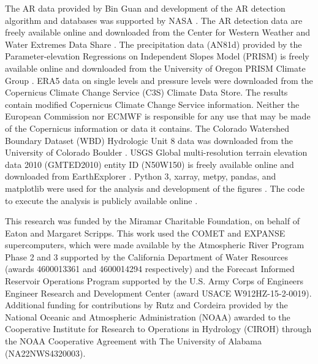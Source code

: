 \documentclass[draft]{agujournal2019}
\begin{document}
The AR data provided by Bin Guan and development of the AR detection algorithm and databases was supported by NASA \cite{Guan2022GlobalDataset}. The  AR detection data are freely available online and downloaded from the Center for Western Weather and Water Extremes Data Share \cite{Rutz2014RutzDataset}. The precipitation data (AN81d) provided by the Parameter-elevation Regressions on Independent Slopes Model (PRISM) is freely available online and downloaded from the University of Oregon PRISM Climate Group \cite{PRISMClimateGroup2004PRISMData}. ERA5 data on single levels \cite{Hersbach2018a} and pressure levels \cite{Hersbach2018} were downloaded from the Copernicus Climate Change Service (C3S) Climate Data Store. The results contain modified Copernicus Climate Change Service information. Neither the European Commission nor ECMWF is responsible for any use that may be made of the Copernicus information or data it contains. The Colorado Watershed Boundary Dataset (WBD) Hydrologic Unit 8 data was downloaded from the University of Colorado Boulder \cite{U.S.GeologicalSurvey2015ColoradoDataset}. USGS Global multi-resolution terrain elevation data 2010 (GMTED2010) entity ID (N50W150) is freely available online and downloaded from EarthExplorer \cite{Danielson2011GlobalDataset}. Python 3, xarray, metpy, pandas, and matplotlib were used for the analysis and development of the figures \cite{thomas_a_caswell_2022_6982547, 
 May2017, metpy, hoyer2017xarray, xarray_v2022.12.0, Hunter:2007, the_pandas_development_team_2022_7344967, VanRossum2009}. The code to execute the analysis is publicly available online \cite{Nash2025CO_top-decile_precipitation_ARs:Software}. 





\acknowledgments
This research was funded by the Miramar Charitable Foundation, on behalf of Eaton and Margaret Scripps. This work used the COMET and EXPANSE supercomputers, which were made available by the Atmospheric River Program Phase 2 and 3 supported by the California Department of Water Resources (awards 4600013361 and 4600014294 respectively) and the Forecast Informed Reservoir Operations Program supported by the U.S. Army Corps of Engineers Engineer Research and Development Center (award USACE W912HZ-15-2-0019). Additional funding for contributions by Rutz and Cordeira provided by the National Oceanic and Atmospheric Administration (NOAA) awarded to the Cooperative Institute for Research to Operations in Hydrology (CIROH) through the NOAA Cooperative Agreement with The University of Alabama (NA22NWS4320003). 
\end{document}
